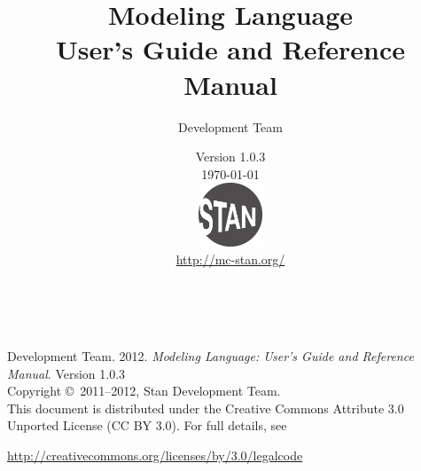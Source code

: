 \title{\Huge\bf \Stan Modeling Language \\[4pt] {\LARGE User's Guide
    and Reference Manual}}
\author{\Stan Development Team}
\date{\vspace*{36pt} \Stan Version 1.0.3 \\[4pt] {\small \today}
\\[36pt]
{
\vfill
\includegraphics[width=0.75in]{../../../logos/stanlogo-main.pdf}}
\\
\vspace*{12pt}
{\small \url{http://mc-stan.org/}}
}
\maketitle

\newpage
\thispagestyle{empty}
\mbox{ }
\vfill
\begin{center}
\begin{minipage}[t]{0.75\textwidth}
\small
\Stan Development Team. 2012.  
{\it \Stan Modeling Language: User's Guide and Reference Manual}. Version
1.0.3
\vspace*{20pt}
\mbox{ }
\\
Copyright \copyright \ 2011--2012, Stan Development Team.
\vspace*{28pt}
\mbox{} \\
This document is distributed under the Creative Commons Attribute 3.0
Unported License (CC BY 3.0).  For full details, see
\begin{center}
\url{http://creativecommons.org/licenses/by/3.0/legalcode} 
\end{center}
\end{minipage}
\vspace*{24pt}
\mbox{ }
\end{center}
